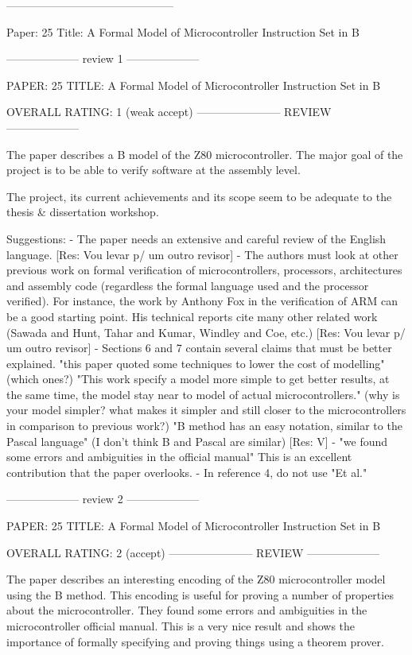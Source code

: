 ---------------------------------------------

Paper: 25 Title: A Formal Model of Microcontroller Instruction Set in B


-------------------- review 1 --------------------

PAPER: 25 TITLE: A Formal Model of Microcontroller Instruction Set in B

OVERALL RATING: 1 (weak accept) ----------------------- REVIEW
--------------------

The paper describes a B model of the Z80 microcontroller. The major goal of the
project is to be able to verify software at the assembly level.

The project, its current achievements and its scope seem to be adequate to the
thesis & dissertation workshop.

Suggestions:
 - The paper needs an extensive and careful review of the English
language. 
[Res: Vou levar p/ um outro revisor]
 - The authors must look at other previous work on formal verification
of microcontrollers, processors, architectures and assembly code (regardless the
formal language used and the processor verified). For instance, the work by
Anthony Fox in the verification of ARM can be a good starting point. His
technical reports cite many other related work (Sawada and Hunt, Tahar and Kumar,
Windley and Coe, etc.)
[Res: Vou levar p/ um outro revisor]
 - Sections 6 and 7 contain several claims that must be better explained. "this paper quoted some
 techniques to lower the cost of modelling" (which ones?) "This work specify a model more simple to get better
results, at the same time, the model stay near to model of actual
microcontrollers." (why is your model simpler? what makes it simpler and still
closer to the microcontrollers in comparison to previous work?) "B method has an
easy notation, similar to the Pascal language" (I don't think B and Pascal are
similar) 
[Res: V]
- "we found some errors and ambiguities in the official manual" This is
an excellent contribution that the paper overlooks. - In reference 4, do not use
"Et al."


-------------------- review 2 --------------------

PAPER: 25 TITLE: A Formal Model of Microcontroller Instruction Set in B

OVERALL RATING: 2 (accept) ----------------------- REVIEW --------------------

The paper describes an interesting encoding of the Z80 microcontroller model
using the B method. This encoding is useful for proving a number of properties
about the microcontroller. They found some errors and ambiguities in the
microcontroller official manual. This is a very nice result and shows the
importance of formally specifying and proving things using a theorem prover.



